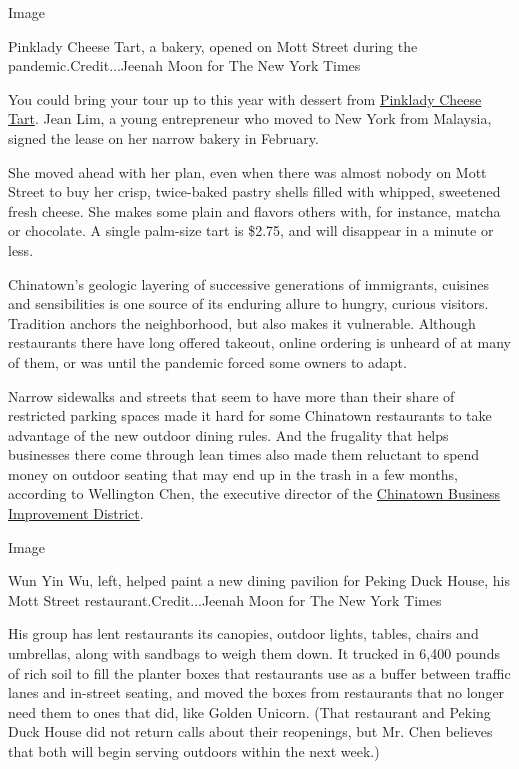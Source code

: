 Image

Pinklady Cheese Tart, a bakery, opened on Mott Street during the
pandemic.Credit...Jeenah Moon for The New York Times

You could bring your tour up to this year with dessert from
\href{https://pinkladycheesetart.business.site/}{Pinklady Cheese Tart}.
Jean Lim, a young entrepreneur who moved to New York from Malaysia,
signed the lease on her narrow bakery in February.

She moved ahead with her plan, even when there was almost nobody on Mott
Street to buy her crisp, twice-baked pastry shells filled with whipped,
sweetened fresh cheese. She makes some plain and flavors others with,
for instance, matcha or chocolate. A single palm-size tart is \$2.75,
and will disappear in a minute or less.

Chinatown's geologic layering of successive generations of immigrants,
cuisines and sensibilities is one source of its enduring allure to
hungry, curious visitors. Tradition anchors the neighborhood, but also
makes it vulnerable. Although restaurants there have long offered
takeout, online ordering is unheard of at many of them, or was until the
pandemic forced some owners to adapt.

Narrow sidewalks and streets that seem to have more than their share of
restricted parking spaces made it hard for some Chinatown restaurants to
take advantage of the new outdoor dining rules. And the frugality that
helps businesses there come through lean times also made them reluctant
to spend money on outdoor seating that may end up in the trash in a few
months, according to Wellington Chen, the executive director of the
\href{http://supportchinatownbid.org/}{Chinatown Business Improvement
District}.

Image

Wun Yin Wu, left, helped paint a new dining pavilion for Peking Duck
House, his Mott Street restaurant.Credit...Jeenah Moon for The New York
Times

His group has lent restaurants its canopies, outdoor lights, tables,
chairs and umbrellas, along with sandbags to weigh them down. It trucked
in 6,400 pounds of rich soil to fill the planter boxes that restaurants
use as a buffer between traffic lanes and in-street seating, and moved
the boxes from restaurants that no longer need them to ones that did,
like Golden Unicorn. (That restaurant and Peking Duck House did not
return calls about their reopenings, but Mr. Chen believes that both
will begin serving outdoors within the next week.)

